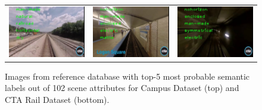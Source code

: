 \documentclass[letterpaper, 10 pt, conference]{ieeeconf}  %
\begin{document}
\begin{figure}
\begin{tabular*}{\textwidth}{ccc}
  \includegraphics[scale=\scaleVal]{4-railroad} &
  \includegraphics[scale=\scaleVal]{5-subway} &
  \includegraphics[scale=\scaleVal]{6-tunnel} \\
 \end{tabular*}
 \caption{Images from reference database with top-5 most probable semantic labels out of 102 scene attributes for Campus Dataset (top) and CTA Rail Dataset (bottom).}
 \label{fig:labelledImages}
\end{figure}
\end{document}
